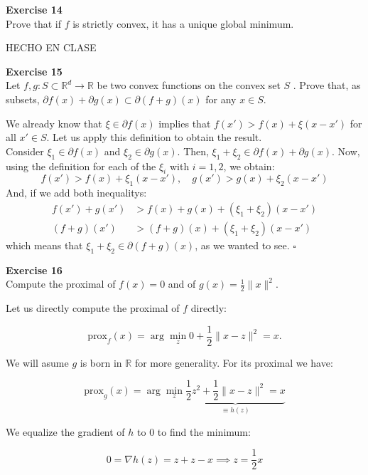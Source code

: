\documentclass[11pt,table]{article}
\newcommand{\qed}{\hfill $\square$}
\newenvironment{problem}[2][Exercise]
    { \begin{mdframed}[backgroundcolor=gray!20] \textbf{#1 #2} \\}
    {  \end{mdframed}}
\newcommand\R{\mathbb R}
\begin{document}
\begin{problem}{14}
Prove that if \( f \)  is strictly convex, it has a unique global minimum.
\end{problem}

HECHO EN CLASE\\

\begin{problem}{15}
Let \( f,g: S \subset \mathbb{R}^d \to \mathbb{R} \)  be two convex functions on the convex set \( S \) . Prove that, as subsets, \(  \partial f(x) + \partial g(x) \subset \partial(f+g)(x) \) for any $x\in S$.
\end{problem}

We already know that \(\xi \in \partial f(x)\) implies that \(f(x') > f(x) + \xi(x-x')\) for all \(x' \in S\). Let us apply this definition to obtain the result.\\
Consider \(\xi_1 \in \partial f(x)\) and \(\xi_2 \in \partial g(x)\). Then, \(\xi_1 + \xi_2 \in \partial f(x) + \partial g(x)\). Now, using the definition for each of the \(\xi_i\) with \(i = 1,2\), we obtain:
\[
  f(x') > f(x) + \xi_1 (x-x'), \quad g(x') > g(x) + \xi_2(x-x')
\]
And, if we add both inequalitys:
\begin{align*}
  f(x') + g(x')        & > f(x) + g(x) + (\xi_1 + \xi_2)(x-x')        \\
  \left(f+g\right)(x') & >\left(f+g\right)(x) + (\xi_1 + \xi_2)(x-x')
\end{align*}
which means that \(\xi_1 + \xi_2 \in \partial \left(f+g\right)(x) \), as we wanted to see. \qed \\

\begin{problem}{16}
Compute the proximal of \( f(x) = 0 \) and of \( g(x) = \frac{1}{2}\|x\|^2 \).
\end{problem}

Let us directly compute the proximal of $f$ directly:

\[
	\text{prox}_f(x) = \arg \min_z 0 + \frac{1}{2} \parallel x - z \parallel^2 = x.
\]

We will asume $g$ is born in $\R$ for more generality. For its proximal we have:

\[
	\text{prox}_g(x) = \arg \min_z \underbrace{\frac{1}{2}z^2 + \frac{1}{2} \parallel x - z \parallel^2 = x}_{\equiv h(z)}
\]

We equalize the gradient of $h$ to $0$ to find the minimum:

\[
	0 = \nabla h(z) = z + z - x \implies z = \frac{1}{2}x
\]
\end{document}
